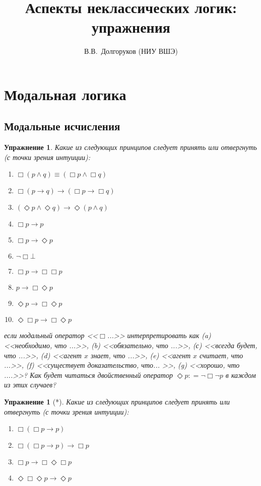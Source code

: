 \documentclass[11pt]{article}
\title{Аспекты неклассических логик: упражнения}
\author{В.В.~Долгоруков (НИУ ВШЭ)}
\newtheorem{exercise}[theorem]{Упражнение}
\begin{document}
\maketitle

\section{Модальная логика}
\subsection{Модальные исчисления}
\begin{exercise} Какие из следующих принципов следует принять или отвергнуть (с точки зрения интуиции):
\begin{multicols}{2}
\begin{enumerate}
\item $\Box (p \wedge q) \equiv (\Box p \wedge \Box q)$
\item $\Box (p \to q) \to (\Box p \to \Box q)$
\item $(\Diamond p \wedge \Diamond q) \to \Diamond (p \wedge q)$
\item $\Box p \to p$
\item $\Box p \to \Diamond p$
\item $\neg \Box \bot$	
\item $\Box p \to \Box \Box p$
\item $p \to \Box \Diamond p$
\item $\Diamond p \to \Box \Diamond p$
\item $\Diamond \Box p \to \Box \Diamond p$
\end{enumerate}
\end{multicols}

если модальный оператор <<$\Box$...>> интерпретировать как
 (a) <<необходимо, что ...>>, (b) <<обязательно, что ...>>, (с) <<всегда будет, что ...>>, (d) <<агент $x$ знает, что ...>>, (e) <<агент $x$ считает, что ...>>, (f) <<существует доказательство, что... >>, (g) <<хорошо, что ....>>? Как будет читаться двойственный оператор $\Diamond p: = \neg \Box \neg p$ в каждом из этих случаев?
\end{exercise}

\begin{exercise}[*] Какие из следующих принципов следует принять или отвергнуть (с точки зрения интуиции):
\begin{multicols}{2}
\begin{enumerate}
\item $\Box (\Box p \to p)$
\item $\Box (\Box p \to p) \to \Box p$
\item $\Box p \to \Box \Diamond \Box p$
 \item $\Diamond \Box \Diamond p \to \Diamond p$
\end{enumerate}
\end{multicols}
\end{exercise}
\end{document}
